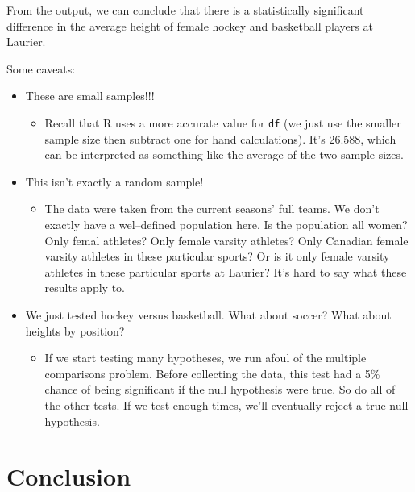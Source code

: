 \documentclass[
  letterpaper,
  DIV=11,
  numbers=noendperiod,
  oneside]{scrreprt}
\providecommand{\tightlist}{%
  \setlength{\itemsep}{0pt}\setlength{\parskip}{0pt}}\usepackage{longtable,booktabs,array}
\begin{document}
From the output, we can conclude that there is a statistically
significant difference in the average height of female hockey and
basketball players at Laurier.

Some caveats:

\begin{itemize}
\tightlist
\item
  These are small samples!!!

  \begin{itemize}
  \tightlist
  \item
    Recall that R uses a more accurate value for \texttt{df} (we just
    use the smaller sample size then subtract one for hand
    calculations). It's 26.588, which can be interpreted as something
    like the average of the two sample sizes.
  \end{itemize}
\item
  This isn't exactly a random sample!

  \begin{itemize}
  \tightlist
  \item
    The data were taken from the current seasons' full teams. We don't
    exactly have a wel--defined population here. Is the population all
    women? Only femal athletes? Only female varsity athletes? Only
    Canadian female varsity athletes in these particular sports? Or is
    it only female varsity athletes in these particular sports at
    Laurier? It's hard to say what these results apply to.
  \end{itemize}
\item
  We just tested hockey versus basketball. What about soccer? What about
  heights by position?

  \begin{itemize}
  \tightlist
  \item
    If we start testing many hypotheses, we run afoul of the multiple
    comparisons problem. Before collecting the data, this test had a 5\%
    chance of being significant if the null hypothesis were true. So do
    all of the other tests. If we test enough times, we'll eventually
    reject a true null hypothesis.
  \end{itemize}
\end{itemize}

\hypertarget{conclusion-1}{%
\section{Conclusion}\label{conclusion-1}}
\end{document}
